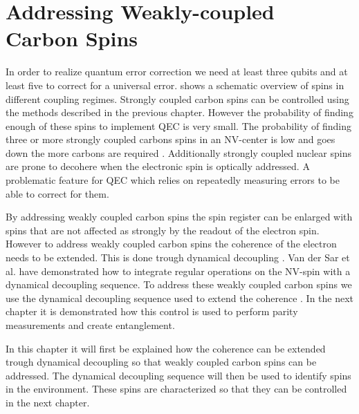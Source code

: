 
\chapter{Addressing Weakly-coupled Carbon Spins}
\label{chap:addressing_weakly_coupled_carbons}

In order to realize quantum error correction we need at least three qubits and at least five to correct for a universal error.
 shows a schematic overview of spins in different coupling regimes.
Strongly coupled carbon spins can be controlled using the methods described in the previous chapter.
However the probability of finding enough of these spins to implement QEC is very small.
The probability of finding three or more strongly coupled carbons spins in an NV-center is low and goes down the more carbons are required \citep{Waldherr2014Quantum,Taminiau2014Universal}.
Additionally strongly coupled nuclear spins are prone to decohere when the electronic spin is optically addressed.
A problematic feature for QEC which relies on repeatedly measuring errors to be able to correct for them.

By addressing weakly coupled carbon spins the spin register can be enlarged with spins that are not affected as strongly by the readout of the electron spin.
However to address weakly coupled carbon spins the coherence of the electron needs to be extended.
This is done trough dynamical decoupling \citep{Lange2010Universal}.
Van der Sar et al. \citep{Sar2012DecoherenceProtected} have demonstrated how to integrate regular operations on the NV-spin with a dynamical decoupling sequence.
To address these weakly coupled carbon spins we use the dynamical decoupling sequence used to extend the coherence \citep{Taminiau2012Detection}.
In the next chapter it is demonstrated how this control is used to perform parity measurements and create entanglement.

In this chapter it will first be explained how the coherence can be extended trough dynamical decoupling so that weakly coupled carbon spins can be addressed.
The dynamical decoupling sequence will then be used to identify spins in the environment.
These spins are characterized so that they can be controlled in the next chapter.


